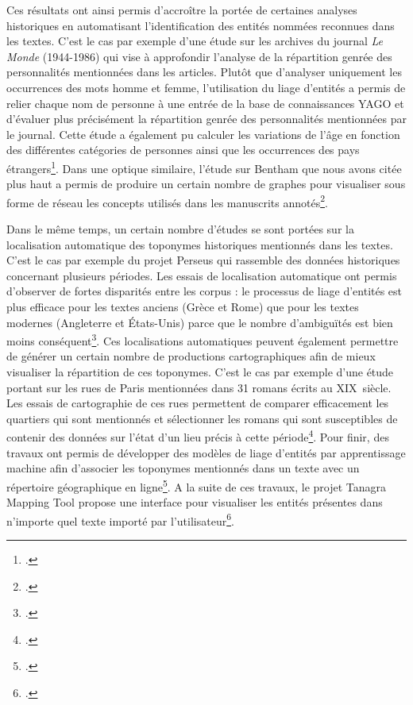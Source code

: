 \documentclass[a4paper,12pt,twoside]{book}
\begin{document}
	Ces résultats ont ainsi permis d'accroître la portée de certaines analyses historiques en automatisant l'identification des entités nommées reconnues dans les textes. C'est le cas par exemple d'une étude sur les archives du journal \textit{Le Monde} (1944-1986) qui vise à approfondir l'analyse de la répartition genrée des personnalités mentionnées dans les articles. Plutôt que d'analyser uniquement les occurrences des mots \og homme\fg{} et \og femme\fg{}, l'utilisation du liage d'entités a permis de relier chaque nom de personne à une entrée de la base de connaissances YAGO et d'évaluer plus précisément la répartition genrée des personnalités mentionnées par le journal. Cette étude a également pu calculer les variations de l'âge en fonction des différentes catégories de personnes ainsi que les occurrences des pays étrangers\footcite{huet_mining_2013}. Dans une optique similaire, l'étude sur Bentham que nous avons citée plus haut a permis de produire un certain nombre de graphes pour visualiser sous forme de réseau les concepts utilisés dans les manuscrits annotés\footcite{ruiz_mapping_2019}. 
	
	Dans le même temps, un certain nombre d'études se sont portées sur la localisation automatique des toponymes historiques mentionnés dans les textes. C'est le cas par exemple du projet Perseus qui rassemble des données historiques concernant plusieurs périodes. Les essais de localisation automatique ont permis d'observer de fortes disparités entre les corpus : le processus de liage d'entités est plus efficace pour les textes anciens (Grèce et Rome) que pour les textes modernes (Angleterre et États-Unis) parce que le nombre d'ambiguïtés est bien moins conséquent\footcite{goos_disambiguating_2001}. Ces localisations automatiques peuvent également permettre de générer un certain nombre de productions cartographiques afin de mieux visualiser la répartition de ces toponymes. C'est le cas par exemple d'une étude portant sur les rues de Paris mentionnées dans 31 romans écrits au XIX\ieme\ siècle. Les essais de cartographie de ces rues permettent de comparer efficacement les quartiers qui sont mentionnés et sélectionner les romans qui sont susceptibles de contenir des données sur l'état d'un lieu précis à cette période\footcite{boeglin_pour_2016}. Pour finir, des travaux ont permis de développer des modèles de liage d'entités par apprentissage machine afin d'associer les toponymes mentionnés dans un texte avec un répertoire géographique en ligne\footcite{santos_toponym_2018}. A la suite de ces travaux, le projet Tanagra Mapping Tool propose une interface pour visualiser les entités présentes dans n'importe quel texte importé par l'utilisateur\footcite{alrahabi_tanagra_2022}.
	
\end{document}
